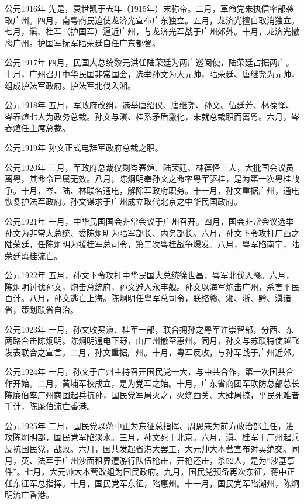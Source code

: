 公元1916年 先是，袁世凯于去年（1915年）末称帝。二月，革命党朱执信率部袭取广州。四月，南粤商民迫使龙济光宣布广东独立。五月，龙济光擅自取消独立。七月，滇、桂军（护国军）逼近广州，与龙济光军战于广州郊外。十月，龙济光撤离广州。护国军抚军陆荣廷自任广东都督。

公元1917年 四月，民国大总统黎元洪任陆荣廷为两广巡阅使，陆荣廷占据两广。十月，广州召开中华民国非常国会，选举孙文为大元帅，陆荣廷、唐继尧为元帅，组成护法军政府。护法军北伐入湘。

公元1918年 五月，军政府改组，选举唐绍仪、唐继尧、孙文、伍廷芳、林葆怿、岑春煊七人为政务总裁。孙文与滇、桂系矛盾激化，未就总裁职而离粤。六月，岑春煊任主席总裁。

公元1919年 孙文正式电辞军政府总裁之职。

公元1920年 三月，军政府总裁仅剩岑春煊、陆荣廷、林葆怿三人，大批国会议员离粤，其命令已属无效。八月，陈炯明奉孙文之命率粤军驱桂，是为第一次粤桂战争。十月，岑、陆、林联名通电，解除军政府职务。十一月，孙文重据广州，通电恢复护法军政府。孙文谋求于广州成立取代北京之中华民国政府。

公元1921年 一月，中华民国国会非常会议于广州召开。四月，国会非常会议选举孙文为非常大总统、委陈炯明为陆军部长、内务部长。六月，孙文下令攻打广西之陆荣廷，任陈炯明为援桂军总司令，第二次粤桂战争爆发。八月，粤军陷南宁，陆荣廷离桂流亡。

公元1922年 五月，孙文下令攻打中华民国大总统徐世昌，粤军北伐入赣。六月，陈炯明讨伐孙文，炮击总统府，孙文避入永丰舰。孙文以海军炮击广州，杀害平民百计。八月，孙文逃亡上海。陈炯明任粤军总司令，联络赣、湘、浙、黔、滇诸省，策划联省自治。

公元1923年 一月，孙文收买滇、桂军一部，联合拥孙之粤军许崇智部，分西、东两路合击陈炯明。陈炯明通电下野，由广州撤至惠州。同月，孙文与苏联特使越飞发表联合之宣言。二月，孙文重据广州。十月，粤军反攻，与孙军战于广州近郊。

公元1924年 一月，孙文于广州主持召开国民党一大，与中共合作，第一次国共合作开始。二月，黄埔军校成立，是为党军之始。十月，广东省商团军联防总部总长陈廉伯率广州商团起兵抗孙，国民党军屠灭之，火烧西关、大肆屠掠，平民死难者千计，陈廉伯流亡香港。

公元1925年 二月，国民党以蒋中正为东征总指挥、周恩来为前方政治部主任，进攻陈炯明部，国民党军陷淡水。三月，孙文死于北京。六月，滇、桂军于广州起兵反抗国民党，战败。六月，国共发起省港大罢工，大元帅大本营宣布对英绝交。同月，英、法军于广州沙面租界遭游行队伍枪击，开枪还击，杀52人，是为“沙基事件”。七月，大元帅大本营改组为国民政府。九月，国民党预备再次东征，蒋中正任东征军总指挥。十月，国民党军东征，陷惠州。十一月，国民党军陷潮州，陈炯明流亡香港。

